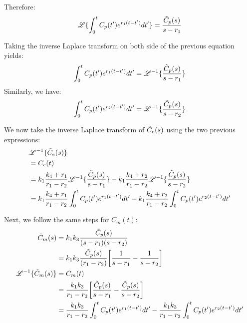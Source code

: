 \documentclass[12pt,twoside]{article}
\begin{document}
Therefore:
\begin{equation*}
\mathscr{L} \{ \int_0^t  C_p(t')  e^{r_1 (t-t')} dt' \}  = \frac{\tilde{ C }_p(s)} {s-r_1} 
\end{equation*}

Taking the inverse Laplace transform on both side of the previous equation yields:
\begin{equation*}
	\int_0^t  C_p(t')  e^{r_1 (t-t')} dt'  = \mathscr{L}^{-1} \{  \frac{\tilde{ C }_p(s)} {s-r_1} \}
\end{equation*}
Similarly, we have:
\begin{equation*}
	\int_0^t  C_p(t')  e^{r_2 (t-t')} dt'  = \mathscr{L}^{-1} \{  \frac{\tilde{ C }_p(s)} {s-r_2} \}
\end{equation*}

We now take the inverse Laplace transform of $\tilde{ C }_e(s)$ using the two previous expressions:
\begin{align*}
&	\mathscr{L}^{-1} \{ \tilde{ C }_e(s) \} \\
& 	= C_e(t) \\
& 	= k_1 \frac{k_4 + r_1}  {r_1 - r_2}  \mathscr{L}^{-1} \{\frac{\tilde{ C }_p(s)} {s - r_1} \} - k_1 \frac{k_4 + r_2}  {r_1 - r_2} \mathscr{L}^{-1} \{ \frac{\tilde{ C }_p(s)} {s - r_2} \} \\
&	= k_1 \frac{k_4 + r_1}  {r_1 - r_2}   \int_0^t  C_p(t')  e^{r_1 (t-t')} dt' - k_1 \frac{k_4 + r_2}  {r_1 - r_2} \int_0^t  C_p(t')  e^{r_2 (t-t')} dt'  \\
\end{align*}

Next, we follow the same steps for $C_m(t)$:
\noindent
\begin{align*}
  \tilde{ C }_m(s) 	&= k_1 k_3 \frac { \tilde{ C }_p(s) } {(s-r_1) (s-r_2) }  \\
  			&= k_1 k_3   \frac { \tilde{ C }_p(s) } {(r_1 - r_2) }  \bigg[ \frac{1} {s - r_1} - \frac{1} {s - r_2}  \bigg]\\
\mathscr{L}^{-1} \{ \tilde{ C }_m(s) \} &= C_m(t) \\			
&= \frac{k_1 k_3} {r_1 - r_2} \bigg[ \frac{ \tilde{ C }_p(s) } {s - r_1} - \frac{ \tilde{ C }_p(s) } {s - r_2}  \bigg]\\
&=  \frac{k_1 k_3} {r_1 - r_2}    \int_0^t  C_p(t')  e^{r_1 (t-t')} dt' -  \frac{k_1 k_3} {r_1 - r_2}   \int_0^t  C_p(t')  e^{r_2 (t-t')} dt'  \\
\end{align*}
\end{document}
